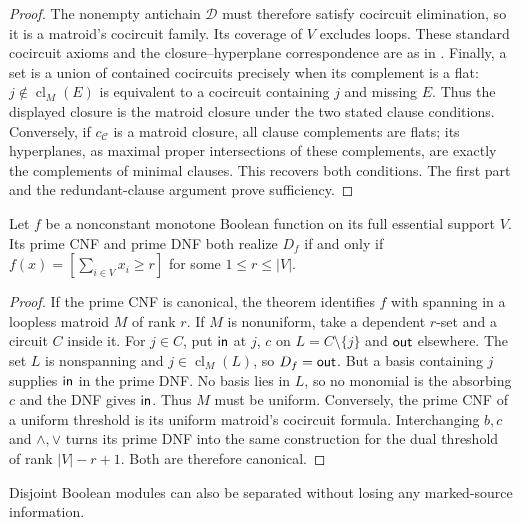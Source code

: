 \begin{proof}
The nonempty antichain $\mathcal D$ must therefore satisfy cocircuit
elimination, so it is a matroid's cocircuit family. Its coverage of $V$
excludes loops. These standard cocircuit axioms and the closure--hyperplane
correspondence are as in \cite[Sections~1.1 and~2.1]{Oxley2011}.
Finally, a set is a union of contained cocircuits precisely when its
complement is a flat: $j\notin\operatorname{cl}_M(E)$ is equivalent
to a cocircuit containing $j$ and missing $E$. Thus the displayed closure
is the matroid closure under the two stated clause conditions.
Conversely, if $c_{\mathcal C}$ is a matroid closure, all clause
complements are flats; its hyperplanes, as maximal proper intersections
of these complements, are exactly the complements of minimal clauses.
This recovers both conditions.
The first part and the redundant-clause argument prove sufficiency.
\end{proof}

\begin{corollary}
\label{core:cor:essential-both-normal-forms}
Let $f$ be a nonconstant monotone Boolean function on its full essential
support $V$. Its prime CNF and prime DNF both realize $D_f$ if and only
if $f(x)=[\sum_{i\in V}x_i\geq r]$ for some $1\leq r\leq|V|$.
\end{corollary}
\begin{proof}
If the prime CNF is canonical, the theorem identifies $f$ with spanning
in a loopless matroid $M$ of rank $r$. If $M$ is nonuniform, take a
dependent $r$-set and a circuit $C$ inside it. For $j\in C$, put
$\mathsf{in}$ at $j$, $c$ on $L=C\setminus\{j\}$ and $\mathsf{out}$
elsewhere. The set $L$ is nonspanning and $j\in\operatorname{cl}_M(L)$,
so $D_f=\mathsf{out}$. But a basis containing $j$ supplies $\mathsf{in}$
in the prime DNF. No basis lies in $L$, so no monomial is the absorbing
$c$ and the DNF gives $\mathsf{in}$. Thus $M$ must be uniform.
Conversely, the prime CNF of a uniform threshold is its uniform matroid's
cocircuit formula. Interchanging $b,c$ and $\wedge,\vee$ turns its prime
DNF into the same construction for the dual threshold of rank
$|V|-r+1$. Both are therefore canonical.
\end{proof}

Disjoint Boolean modules can also be separated without losing any
marked-source information.


